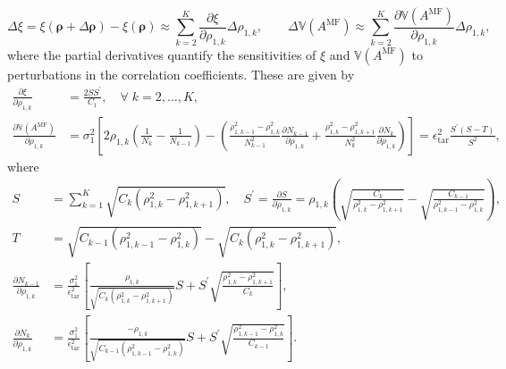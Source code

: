 %
\[
\Delta\xi=\xi(\boldsymbol{\rho}+\Delta \boldsymbol{\rho}) - \xi(\boldsymbol{\rho}) \approx \sum_{k=2}^K \frac{\partial \xi}{\partial \rho_{1,k}} \Delta\rho_{1,k},\quad \quad \Delta \mathbb{V}\left(A^{\text{MF}}\right)\approx \sum_{k=2}^K \frac{\partial  \mathbb{V}\left(A^{\text{MF}}\right)}{\partial  \rho_{1,k}}  \Delta\rho_{1,k},
\]
%
where the partial derivatives quantify the sensitivities of $\xi$ and $\mathbb{V}(A^{\text{MF}})$ to perturbations in the correlation coefficients. These are given by
%
\begin{align}
\label{eq:partial_xi_rho}
    \frac{\partial  \xi}{\partial  \rho_{1,k}} 
&=\frac{2SS^\prime}{C_1}, \quad \forall\; k=2,\ldots, K,\\
\label{eq:partial_var_rho}
\frac{\partial  \mathbb{V}\left(A^{\text{MF}}\right)}{\partial  \rho_{1,k}} 
&=\sigma_1^2\left[2\rho_{1,k}\left(\frac{1}{N_{k}} - \frac{1}{N_{k-1}}\right)-\left( \frac{\rho_{1,k-1}^2 -\rho_{1,k}^2 }{N_{k-1}^2}\frac{\partial N_{k-1}}{\partial  \rho_{1,k}}+\frac{\rho_{1,k}^2 -\rho_{1,k+1}^2 }{N_k^2}\frac{\partial N_k}{\partial  \rho_{1,k}}\right)\right]=\epsilon_{\text{tar}}^2\frac{S^\prime \left(S-T\right)}{S^2},
\end{align}
%
where
%
\begin{align}
S& = \sum_{k=1}^K\sqrt{C_k\left(\rho_{1,k}^2-\rho_{1,k+1}^2\right)},\quad
S^\prime = \frac{\partial  S}{\partial  \rho_{1,k}} = \rho_{1,k}\left(\sqrt{\frac{C_k}{\rho_{1,k}^2-\rho_{1,k+1}^2}} - \sqrt{\frac{C_{k-1}}{\rho_{1,k-1}^2-\rho_{1,k}^2}}\right),\\
\nonumber
T &=  \sqrt{C_{k-1}\left(\rho_{1,k-1}^2 - \rho_{1,k}^2\right)} - \sqrt{C_{k}\left(\rho_{1,k}^2 - \rho_{1,k+1}^2\right)},\\
\nonumber
\frac{\partial N_{k-1}}{\partial  \rho_{1,k}}&=\frac{\sigma_1^2}{\epsilon_{\text{tar}}^2}\left[\frac{\rho_{1,k}}{\sqrt{C_{k}\left(\rho_{1,k}^2 - \rho_{1,k+1}^2\right)}}S+S^\prime \sqrt{\frac{\rho_{1,k}^2 - \rho_{1,k+1}^2}{C_{k}}}\right],\\
\nonumber
\frac{\partial N_{k}}{\partial  \rho_{1,k}}&=\frac{\sigma_1^2}{\epsilon_{\text{tar}}^2}\left[\frac{-\rho_{1,k}}{\sqrt{C_{k-1}\left(\rho_{1,k-1}^2 - \rho_{1,k}^2\right)}}S+S^\prime \sqrt{\frac{\rho_{1,k-1}^2 - \rho_{1,k}^2}{C_{k-1}}}\right].
\end{align}
